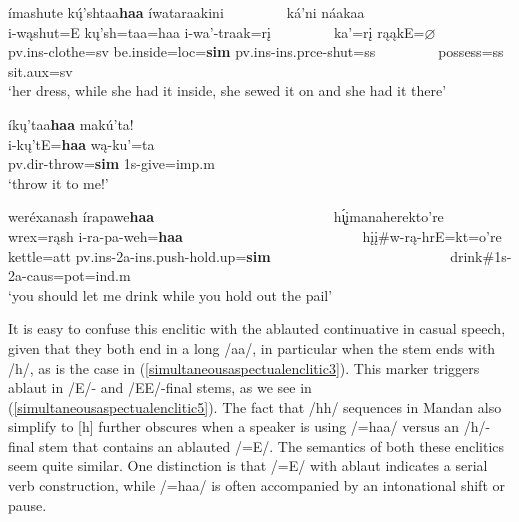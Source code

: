 \begin{exe}
\begin{xlist}
	\item\label{simultaneousaspectualenclitic4} 
 	\glll ímashute kų́'shtaa\textbf{haa} íwataraakini ~ ~ ~ ~ ~ ká'ni náakaa\\
	i-wąshut=E kų'sh=taa=haa i-wa'-traak=rį ~ ~ ~ ~ ~ ka'=rį rąąkE=$\varnothing$\\
	pv.ins-\textnormal{clothe}=sv \textnormal{be.inside}=loc=\textbf{sim} pv.ins-ins.prce-\textnormal{shut}=ss ~ ~ ~ ~ ~  \textnormal{possess}=ss \textnormal{sit}.aux=sv\\
	\glt `her dress, while she had it inside, she sewed it on and she had it there' \citep[106]{hollow1973a}
	
	\item\label{simultaneousaspectualenclitic5} 
	\glll íkų'taa\textbf{haa} makú'ta!\\
	i-kų'tE=\textbf{haa} wą-ku'=ta\\
	pv.dir-\textnormal{throw}=\textbf{sim} 1s-\textnormal{give}=imp.m\\
	\glt `throw it to me!' \citep[132]{hollow1973a}

	\item\label{simultaneousaspectualenclitic6} \glll weréxanash írapawe\textbf{haa} ~ ~ ~ ~ ~ ~ ~ ~ ~ ~ ~ ~ ~ ~ ~ h\'{ı̨}įmanaherekto're\\
	wrex=rąsh i-ra-pa-weh=\textbf{haa} ~ ~ ~ ~ ~ ~ ~ ~ ~ ~ ~ ~ ~ ~ ~ hįį\#w-rą-hrE=kt=o're\\
	\textnormal{kettle}=att pv.ins-2a-ins.push-\textnormal{hold.up}=\textbf{sim} ~ ~ ~ ~ ~ ~ ~ ~ ~ ~ ~ ~ ~ ~ ~  \textnormal{drink}\#1s-2a-caus=pot=ind.m\\
	\glt `you should let me drink while you hold out the pail' \citep[131]{hollow1973a}

	\end{xlist}

\end{exe}

It is easy to confuse this enclitic with the ablauted continuative in casual speech, given that they both end in a long /aa/, in particular when the stem ends with /h/, as is the case in (\ref{simultaneousaspectualenclitic3}). This marker triggers ablaut in /E/- and /EE/-final stems, as we see in (\ref{simultaneousaspectualenclitic5}). The fact that /hh/ sequences in Mandan also simplify to [h] further obscures when a speaker is using /=haa/ versus an /h/-final stem that contains an ablauted /=E/. The semantics of both these enclitics seem quite similar. One distinction is that /=E/ with ablaut indicates a serial verb construction, while /=haa/ is often accompanied by an intonational shift or pause.

